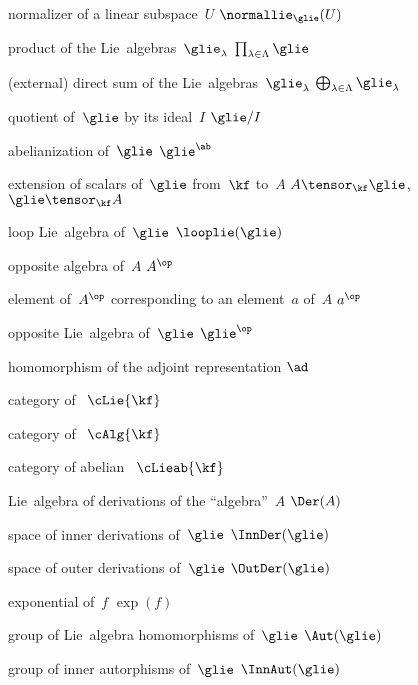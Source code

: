 {normalizer of a linear subspace~$U$}
{$\normallie_{\glie}(U)$}

{product of the Lie~algebras~$\glie_\lambda$}
{$\prod_{\lambda \in \Lambda} \glie$}

{(external) direct sum of the Lie~algebras~$\glie_\lambda$}
{$\bigoplus_{\lambda \in \Lambda} \glie_\lambda$}

{quotient of~$\glie$ by its ideal~$I$}
{$\glie/I$}

{abelianization of~$\glie$}
{$\glie^{\ab}$}

{extension of scalars of~$\glie$ from~$\kf$ to~$A$}
{$A \tensor_{\kf} \glie$,~$\glie \tensor_{\kf} A$}

{loop Lie~algebra of~$\glie$}
{$\looplie(\glie)$}

{opposite algebra of~$A$}
{$A^{\op}$}

{element of~$A^\op$ corresponding to an element~$a$ of~$A$}
{$a^{\op}$}

{opposite Lie~algebra of~$\glie$}
{$\glie^{\op}$}

{homomorphism of the adjoint representation}
{$\ad$}

{category of~\liealgebras{$\kf$}}
{$\cLie{\kf}$}

{category of~\algebras{$\kf$}}
{$\cAlg{\kf}$}

{category of abelian~\liealgebras{$\kf$}}
{$\cLieab{\kf}$}

{Lie~algebra of derivations of the \enquote{algebra}~$A$}
{$\Der(A)$}

{space of inner derivations of~$\glie$}
{$\InnDer(\glie)$}

{space of outer derivations of~$\glie$}
{$\OutDer(\glie)$}

{exponential of~$f$}
{$\exp(f)$}

{group of Lie~algebra homomorphisms of~$\glie$}
{$\Aut(\glie)$}

{group of inner autorphisms of~$\glie$}
{$\InnAut(\glie)$}

